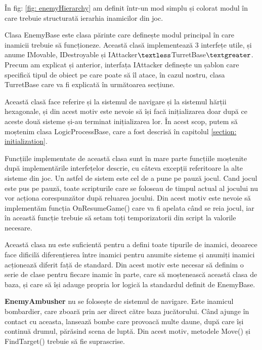 \documentclass[12pt, a4paper]{article}
\begin{document}
	În fig: \ref{fig: enemyHierarchy} am definit într-un mod simplu și colorat modul în care trebuie structurată ierarhia inamicilor din joc.
	\newline
	
	Clasa EnemyBase este clasa părinte care definește modul principal în care inamicii trebuie să funcționeze. Această clasă implementează 3 interfețe utile, și anume IMovable, IDestroyable și IAttacker$\textless$TurretBase$\textgreater$. Precum am explicat și anterior, interfața IAttacker definește un șablon care specifică tipul de obiect pe care poate să îl atace, în cazul nostru, clasa TurretBase care va fi explicată în următoarea secțiune.
	\newline
	
	Această clasă face referire și la sistemul de navigare și la sistemul hărții hexagonale, și din acest motiv este nevoie să își facă inițializarea doar după ce aceste două sisteme și-au terminat inițializarea lor. În acest scop, putem să moștenim clasa LogicProcessBase, care a fost descrisă în capitolul \ref{section: initialization}.
	\newline
	
	Funcțiile implementate de această clasa sunt în mare parte funcțiile \newline moștenite după implementările interfețelor descrie, cu câteva excepții referitoare la alte sisteme din joc. Un astfel de sistem este cel de a pune pe pauză jocul. Cand jocul este pus pe pauză, toate scripturile care se foloseau de timpul actual al jocului nu vor acționa corespunzător după reluarea jocului. Din acest motiv este nevoie să implementăm funcția OnResumeGame() care va fi apelata când se reia jocul, iar în această funcție trebuie să setam toți temporizatorii din script la valorile necesare.
	\newline
	
	Această clasa nu este suficientă pentru a defini toate tipurile de inamici, deoarece face dificilă diferențierea între inamici pentru anumite sisteme și anumiți inamici acționează diferit față de standard. Din acest motiv este necesar să definim o serie de clase pentru fiecare inamic în parte, care să moștenească această clasa de baza, și care să își adauge propria lor logică la standardul definit de EnemyBase.
	\newline
	
	\textbf{EnemyAmbusher} nu se folosește de sistemul de navigare. Este inamicul bombardier, care zboară prin aer direct către baza jucătorului. Când ajunge în contact cu aceasta, lansează bombe care provoacă multe daune, după care își continuă drumul, părăsind scena de luptă. Din acest motiv, metodele Move() și FindTarget() trebuie să fie suprascrise.
	\newline
	
\end{document}
